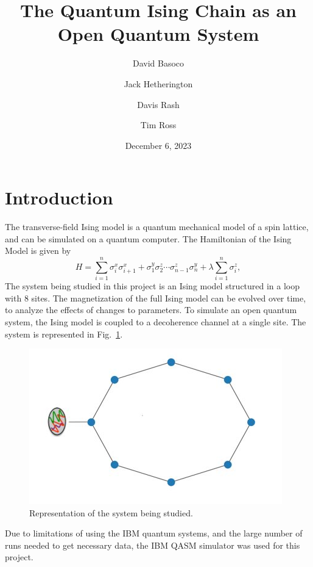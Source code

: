 \documentclass[12pt, twocolumn]{article}
\title{The Quantum Ising Chain as an Open Quantum System}
\author{David Basoco \and Jack Hetherington \and Davis Rash \and Tim Ross}
\date{December 6, 2023}
\begin{document}
  \maketitle

  \section{Introduction}

  The transverse-field Ising model is a quantum mechanical model of a spin lattice, and can be simulated on a quantum computer. The Hamiltonian of the Ising Model is given by
  \begin{equation}
    \label{eq:hamiltonian}
    H = \sum_{i = 1}^{n} \sigma_{i}^{x} \sigma_{i + 1}^{x}
        + \sigma_{1}^{y} \sigma_{2}^{z} \dotsm \sigma_{n - 1}^{z} \sigma_{n}^{y}
        + \lambda \sum_{i = 1}^{n} \sigma_{i}^{z},
  \end{equation}
  The system being studied in this project is an Ising model structured in a loop with 8 sites.
  The magnetization of the full Ising model can be evolved over time, to analyze the effects of changes to parameters. To simulate an open quantum system, the Ising model is coupled to a decoherence channel at a single site. The system is represented in Fig.~\ref{fig:SystemDiagram}.
  \begin{figure}[!htb]
    \centering
    \includegraphics[width=\columnwidth]{images/SystemDiagram.png}
    \caption{Representation of the system being studied.%
      \label{fig:SystemDiagram}}
  \end{figure}
  Due to limitations of using the IBM quantum systems, and the large number of runs needed to get necessary data, the IBM QASM simulator was used for this project.
\end{document}
